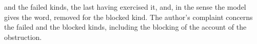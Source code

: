 and the failed kinds, the last having exercised it, and, in the sense the model gives the word, removed for the blocked kind. The author's complaint concerns the failed and the blocked kinds, including the blocking of the account of the obstruction.

